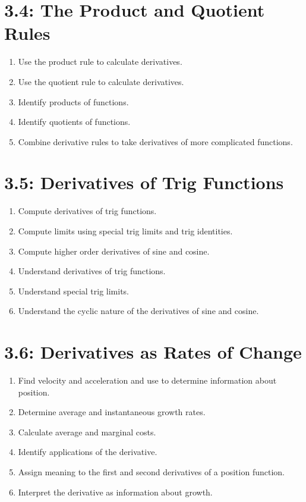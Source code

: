 \documentclass[11pt]{article}
\begin{document}
\section*{3.4: The Product and Quotient Rules}
\begin{enumerate}
	\item Use the product rule to calculate derivatives.
	\item Use the quotient rule to calculate derivatives.
	\item Identify products of functions.
	\item Identify quotients of functions.
	\item Combine derivative rules to take derivatives of more complicated functions.
\end{enumerate}

\section*{3.5: Derivatives of Trig Functions}
\begin{enumerate}
	\item Compute derivatives of trig functions.
	\item Compute limits using special trig limits and trig identities.
	\item Compute higher order derivatives of sine and cosine.
	\item Understand derivatives of trig functions.
	\item Understand special trig limits.
	\item Understand the cyclic nature of the derivatives of sine and cosine.
\end{enumerate}

\section*{3.6: Derivatives as Rates of Change}
\begin{enumerate}
	\item Find velocity and acceleration and use to determine information about position.
	\item Determine average and instantaneous growth rates.
	\item Calculate average and marginal costs.
	\item Identify applications of the derivative.
	\item Assign meaning to the first and second derivatives of a position function.
	\item Interpret the derivative as information about growth.
\end{enumerate}
\end{document}
